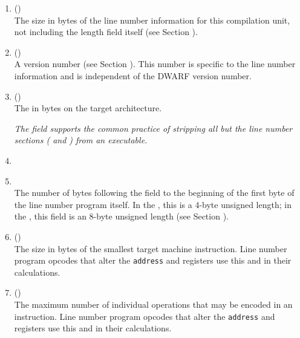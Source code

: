 \begin{enumerate}[1. ]
\item \HFNunitlength{} ()  \\
The size in bytes of the line number information for this
compilation unit, not including the length field itself
(see Section ). 

\item \HFNversion{} (\HFTuhalf) \\
A version number 
(see Section ). 
This number is specific to
the line number information and is independent of the DWARF
version number. 

\item \HFNaddresssize{} (\HFTubyte) \\
\bb
The 
in bytes on the target architecture. 
\eb

\textit{The \HFNaddresssize{} field 
\bb
supports 
\eb
the common practice of stripping all but 
the line number sections (\dotdebugline{} and \dotdebuglinestr{}) 
from an executable.}

\item \HFNreservedwassegmentselectorsize{}
\bbeb
\\

\item \HFNheaderlength{}  \\
The number of bytes following the \HFNheaderlength{} field to the
beginning of the first byte of the line number program itself.
In the \thirtytwobitdwarfformat, this is a 4-byte unsigned
length; in the \sixtyfourbitdwarfformat, this field is an
8-byte unsigned length 
(see Section ). 

\item \HFNminimuminstructionlength{} (\HFTubyte)  \\
The size in bytes of the smallest target machine
instruction. Line number program opcodes that alter
the \texttt{address} and 
registers use this and \HFNmaximumoperationsperinstruction{}
in their calculations. 

\item \HFNmaximumoperationsperinstruction{} (\HFTubyte) \\
The maximum number of individual operations that may be
encoded in an instruction. Line number program opcodes
that alter the \texttt{address} and 
 registers use this and
\HFNminimuminstructionlength{} in their calculations.


\end{enumerate}
